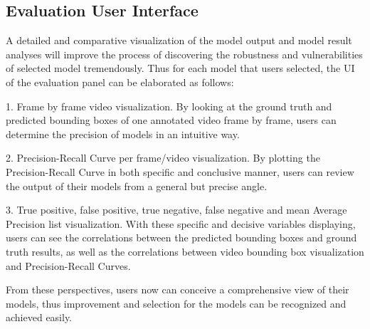 \documentclass[conference]{IEEEtran}
\def\figref#1{Fig.~\ref{#1}}
\begin{document}
\subsection{Evaluation User Interface}

	A detailed and comparative visualization of the model output and model result analyses will improve the process of discovering the robustness and vulnerabilities of selected model tremendously. Thus for each model that users selected, the UI of the evaluation panel can be elaborated as follows: \par
	1. Frame by frame video visualization. 
By looking at the ground truth and predicted bounding boxes of one annotated video frame by frame, users can determine the precision of models in an intuitive way.\par
	2. Precision-Recall Curve per frame/video visualization. 
By plotting the Precision-Recall Curve in both specific and conclusive manner, users can review the output of their models from a general but precise angle.\par
	3. True positive, false positive, true negative, false negative and mean Average Precision list visualization. 
With these specific and decisive variables displaying, users can see the correlations between the predicted bounding boxes and ground truth results, as well as the correlations between video bounding box visualization and Precision-Recall Curves.\par
From these perspectives, users now can conceive a comprehensive view of their models, thus improvement and selection for the models can be recognized and achieved easily.


	


\end{document}
